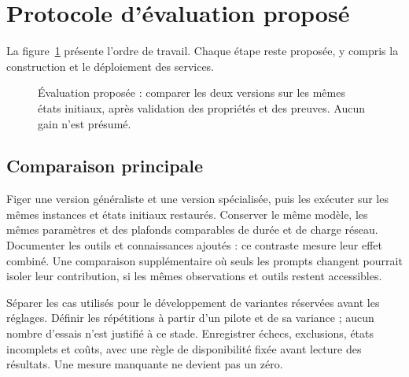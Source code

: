 \documentclass[11pt,a4paper]{article}
\begin{document}
\section{Protocole d'évaluation proposé}
La figure~\ref{fig:protocol} présente l'ordre de travail. Chaque étape reste
proposée, y compris la construction et le déploiement des services.

\begin{figure}[H]\centering
{}
\caption{Évaluation proposée : comparer les deux versions sur les mêmes états initiaux, après validation des propriétés et des preuves. Aucun gain n'est présumé.}\label{fig:protocol}
\end{figure}

\subsection{Comparaison principale}
Figer une version généraliste et une version spécialisée, puis les exécuter sur
les mêmes instances et états initiaux restaurés. Conserver le même modèle,
les mêmes paramètres et des plafonds comparables de durée et de charge réseau.
Documenter les outils et connaissances ajoutés : ce contraste mesure leur effet
combiné. Une comparaison supplémentaire où seuls les prompts changent pourrait
isoler leur contribution, si les mêmes observations et outils restent accessibles.

Séparer les cas utilisés pour le développement de variantes réservées avant
les réglages. Définir les répétitions à partir d'un pilote et de sa variance ;
aucun nombre d'essais n'est justifié à ce stade. Enregistrer échecs, exclusions,
états incomplets et coûts, avec une règle de disponibilité fixée avant lecture
des résultats. Une mesure manquante ne devient pas un zéro.
\end{document}
